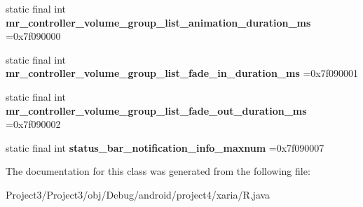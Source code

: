\begin{DoxyCompactItemize}
static final int {\bfseries mr\+\_\+controller\+\_\+volume\+\_\+group\+\_\+list\+\_\+animation\+\_\+duration\+\_\+ms} =0x7f090000
\item 
\mbox{\label{classproject4_1_1xaria_1_1R_1_1integer_a3c8f570f0ae2b09ad45c5a1e98b2b43f}} 
static final int {\bfseries mr\+\_\+controller\+\_\+volume\+\_\+group\+\_\+list\+\_\+fade\+\_\+in\+\_\+duration\+\_\+ms} =0x7f090001
\item 
\mbox{\label{classproject4_1_1xaria_1_1R_1_1integer_a8685f1c5b0fc9423fe1a907335c370b2}} 
static final int {\bfseries mr\+\_\+controller\+\_\+volume\+\_\+group\+\_\+list\+\_\+fade\+\_\+out\+\_\+duration\+\_\+ms} =0x7f090002
\item 
\mbox{\label{classproject4_1_1xaria_1_1R_1_1integer_af4740fb586f0467a06fe4a74e39c835c}} 
static final int {\bfseries status\+\_\+bar\+\_\+notification\+\_\+info\+\_\+maxnum} =0x7f090007
\end{DoxyCompactItemize}


The documentation for this class was generated from the following file\+:\begin{DoxyCompactItemize}
\item 
Project3/\+Project3/obj/\+Debug/android/project4/xaria/R.\+java\end{DoxyCompactItemize}
